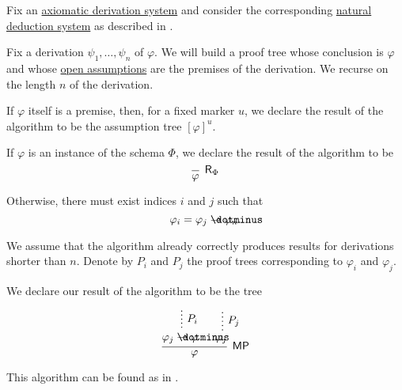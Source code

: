 \begin{algorithm}\label{alg:axiomatic_derivation_to_proof_tree}
  Fix an \hyperref[def:axiomatic_derivation_system]{axiomatic derivation system} and consider the corresponding \hyperref[def:abstract_natural_deduction_system]{natural deduction system} as described in .

  Fix a derivation \( \psi_1, \ldots, \psi_n \) of \( \varphi \). We will build a proof tree whose conclusion is \( \varphi \) and whose \hyperref[def:natural_deduction_proof_tree/context]{open assumptions} are the premises of the derivation. We recurse on the length \( n \) of the derivation.

  \begin{thmenum}
     If \( \varphi \) itself is a premise, then, for a fixed marker \( u \), we declare the result of the algorithm to be the assumption tree \( [\varphi]^u \).

     If \( \varphi \) is an instance of the schema \( \Phi \), we declare the result of the algorithm to be
    \begin{equation*}
      \begin{prooftree}
        \infer0[\ensuremath{ \logic{R}_\Phi }]{ \varphi }
      \end{prooftree}
    \end{equation*}

     Otherwise, there must exist indices \( i \) and \( j \) such that
    \begin{equation*}
      \varphi_i = \varphi_j \synimplies \varphi_n.
    \end{equation*}

    We assume that the algorithm already correctly produces results for derivations shorter than \( n \). Denote by \( P_i \) and \( P_j \) the proof trees corresponding to \( \varphi_i \) and \( \varphi_j \).

    We declare our result of the algorithm to be the tree
    \begin{equation*}
      \begin{prooftree}
        \hypo{}
        \ellipsis { \( P_i \) } { \varphi_j \synimplies \varphi }

        \hypo{}
        \ellipsis { \( P_j \) } { \varphi_j }

        \infer2[\logic{MP}]{ \varphi }
      \end{prooftree}
    \end{equation*}
  \end{thmenum}
\end{algorithm}
\begin{comments}
  \item This algorithm can be found as  in \cite{notebook:code}.
\end{comments}

